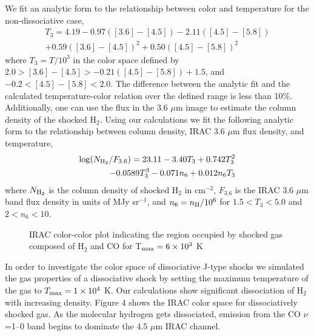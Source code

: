 \documentclass[iop]{emulateapj}
\begin{document}
We fit an analytic form to the relationship between color and temperature 
for the non-dissociative case,
\begin{eqnarray}
T_{3} = 4.19 - 0.97([3.6]\!\!-\!\![4.5]) - 2.11([4.5]\!\!-\!\![5.8]) \nonumber\\
       +0.59([3.6]\!\!-\!\![4.5])^{2} + 0.50([4.5]\!\!-\!\![5.8])^{2} \nonumber
\end{eqnarray}
where $T_{3} = T/10^{3}$ in the color space defined by
$2.0 > [3.6]\!\!-\!\![4.5] > -0.21([4.5]\!\!-\!\![5.8]) + 1.5$, 
%
and $-0.2 < [4.5]\!\!-\!\![5.8] < 2.0$. 
The difference between the analytic fit and the calculated 
temperature-color relation over the defined range is less than 10\%. 
Additionally, one can use the flux in the 3.6 $\mu$m image to estimate
the column density of the shocked H$_2$.
Using our calculations we fit the following analytic form to the 
relationship between column density, IRAC 3.6 $\mu$m flux density, and temperature,
\begin{eqnarray}
\log(N_{\rm{H}_{2}}/F_{3.6}) = 23.11 - 3.40T_{3} + 0.742T_{3}^{2} \nonumber\\ 
 - 0.0589T_{3}^{3} - 0.071n_{6} + 0.012n_{6}T_{3} \nonumber 
\end{eqnarray} 
where $N_{\rm{H}_{2}}$ is the column density of shocked H$_2$ in cm$^{-2}$, $F_{3.6}$
is the IRAC 3.6 $\mu$m band flux density in units of MJy sr$^{-1}$, 
and $n_{6} = n_{\rm{H}}/10^{6}$
for $1.5 < T_{3} < 5.0$ and $2 < n_{6} < 10$.

\begin{figure}
%
\caption{ IRAC color-color plot indicating the region occupied by shocked 
gas composed of H$_2$ and CO for T$_{\rm{max}} = 6 \times 10^{3}$ K 
} 
\end{figure}

In order to investigate the color space of dissociative J-type
shocks we simulated the gas properties of a dissociative shock by 
setting the maximum
temperature of the gas to $T_{\rm{max}} = 1 \times 10^{4}$ K. 
Our calculations show significant dissociation of H$_2$ with increasing density. 
Figure 4 shows the IRAC color space
for dissociatively shocked gas. As the molecular hydrogen gets 
dissociated, emission from the CO $\nu$=1--0 band begins to 
dominate the 4.5 $\mu$m IRAC channel. 
\end{document}
